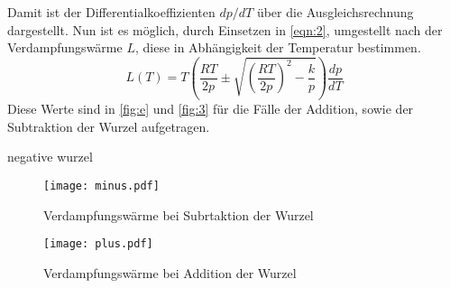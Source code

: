 Damit ist der Differentialkoeffizienten $dp/dT$ über die
Ausgleichsrechnung dargestellt. Nun ist es möglich, durch Einsetzen in
\autoref{eqn:2}, umgestellt nach der Verdampfungswärme $L$,
diese in Abhängigkeit der Temperatur bestimmen.
\begin{equation}
L(T) = T \left(\frac{RT}{2p}\pm\sqrt{\left(\frac{RT}{2p}\right)^2-\frac{k}{p}}\right) \frac{dp}{dT}
\end{equation}
\noindent Diese Werte sind in \autoref{fig:e} und \autoref{fig:3} 
für die Fälle der Addition, sowie der Subtraktion der 
Wurzel aufgetragen.







negative wurzel
\begin{figure}[H]
  \centering
  \texttt{[image: minus.pdf]}
  \caption{Verdampfungswärme bei Subrtaktion der Wurzel}
  \label{fig:e}
\end{figure}

\begin{figure}[H]
  \centering
  \texttt{[image: plus.pdf]}
  \caption{Verdampfungswärme bei Addition der Wurzel}
  \label{fig:3}
\end{figure}


